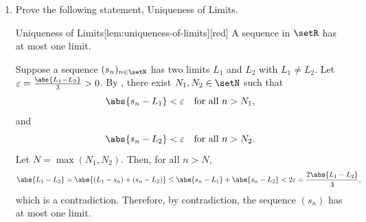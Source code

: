 \begin{enumerate}
  \item Prove the following statement, Uniqueness of Limits.
  \begin{define}{Uniqueness of Limits}[lem:uniqueness-of-limits][red]
    A sequence in \(\setR\) has at most one limit.
  \end{define}
  \begin{subprove}
    Suppose a sequence \((s_n)_{n\in\setN}\) has two limits \(L_1\) and \(L_2\) with \(L_1 \neq L_2\).
    Let \(\varepsilon = \frac{\abs{L_1 - L_2}}{3} > 0\).
    By , there exist \(N_1, N_2 \in \setN\) such that
    \[
      \abs{s_n - L_1} < \varepsilon \quad\text{for all } n > N_1,
    \]
    and
    \[
      \abs{s_n - L_2} < \varepsilon \quad\text{for all } n > N_2.
    \]
    Let \(N = \max(N_1, N_2)\). Then, for all \(n > N\),
    \[
      \abs{L_1 - L_2} = \abs{(L_1 - s_n) + (s_n - L_2)} \leq \abs{s_n - L_1} + \abs{s_n - L_2} < 2\varepsilon = \frac{2\abs{L_1 - L_2}}{3},
    \]
    which is a contradiction. Therefore, by contradiction, the sequence \((s_n)\) has at most one limit.
  \end{subprove}
\end{enumerate}



